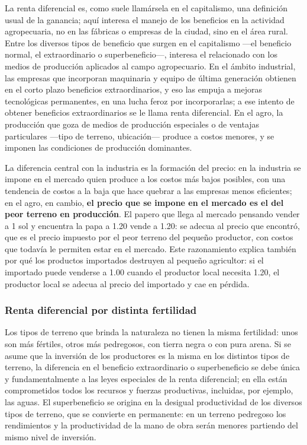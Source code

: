 \documentclass[
  man,
  floatsintext,
  longtable,
  a4paper,
  nolmodern,
  notxfonts,
  notimes,
  12pt,
  colorlinks=true,linkcolor=blue,citecolor=blue,urlcolor=blue]{apa7}
\begin{document}
La renta diferencial es, como suele llamársela en el capitalismo, una
definición usual de la ganancia; aquí interesa el manejo de los
beneficios en la actividad agropecuaria, no en las fábricas o empresas
de la ciudad, sino en el área rural. Entre los diversos tipos de
beneficio que surgen en el capitalismo ---el beneficio normal, el
extraordinario o superbeneficio---, interesa el relacionado con los
medios de producción aplicados al campo agropecuario. En el ámbito
industrial, las empresas que incorporan maquinaria y equipo de última
generación obtienen en el corto plazo beneficios extraordinarios, y eso
las empuja a mejoras tecnológicas permanentes, en una lucha feroz por
incorporarlas; a ese intento de obtener beneficios extraordinarios se le
llama renta diferencial. En el agro, la producción que goza de medios de
producción especiales o de ventajas particulares ---tipo de terreno,
ubicación--- produce a costos menores, y se imponen las condiciones de
producción dominantes.

La diferencia central con la industria es la formación del precio: en la
industria se impone en el mercado quien produce a los costos más bajos
posibles, con una tendencia de costos a la baja que hace quebrar a las
empresas menos eficientes; en el agro, en cambio, \textbf{el precio que
se impone en el mercado es el del peor terreno en producción}. El papero
que llega al mercado pensando vender a 1 sol y encuentra la papa a 1.20
vende a 1.20: se adecua al precio que encontró, que es el precio
impuesto por el peor terreno del pequeño productor, con costos que
todavía le permiten estar en el mercado. Este razonamiento explica
también por qué los productos importados destruyen al pequeño
agricultor: si el importado puede venderse a 1.00 cuando el productor
local necesita 1.20, el productor local se adecua al precio del
importado y cae en pérdida.

\subsubsection{Renta diferencial por distinta
fertilidad}\label{renta-diferencial-por-distinta-fertilidad}

Los tipos de terreno que brinda la naturaleza no tienen la misma
fertilidad: unos son más fértiles, otros más pedregosos, con tierra
negra o con pura arena. Si se asume que la inversión de los productores
es la misma en los distintos tipos de terreno, la diferencia en el
beneficio extraordinario o superbeneficio se debe única y
fundamentalmente a las leyes especiales de la renta diferencial; en ella
están comprometidos todos los recursos y fuerzas productivas, incluidas,
por ejemplo, las aguas. El superbeneficio se origina en la desigual
productividad de los diversos tipos de terreno, que se convierte en
permanente: en un terreno pedregoso los rendimientos y la productividad
de la mano de obra serán menores partiendo del mismo nivel de inversión.
\end{document}
